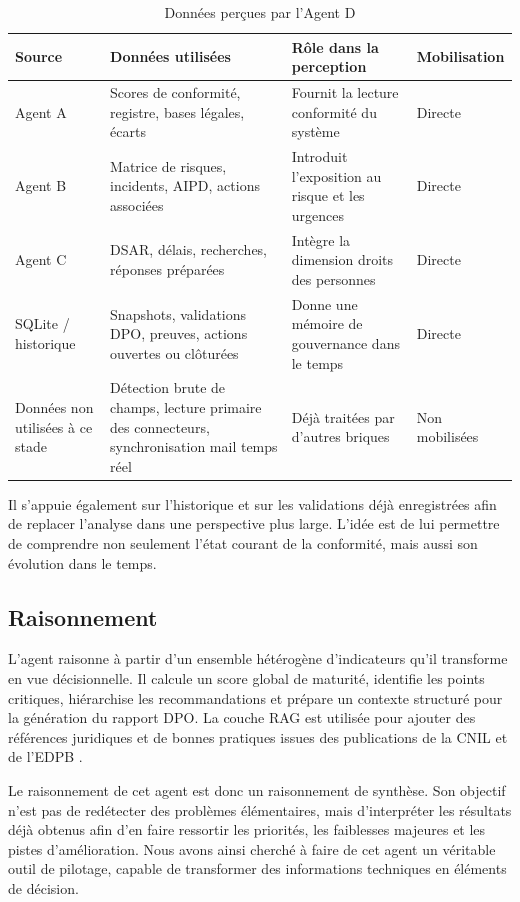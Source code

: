 \documentclass[12pt,a4paper]{report}
\begin{document}
\begin{table}[H]
\centering
\caption{Données perçues par l'Agent D}
\label{tab:perception_agent_d}
\begin{tabularx}{\textwidth}{|p{3cm}|X|X|p{2.7cm}|}
\hline
\textbf{Source} & \textbf{Données utilisées} & \textbf{Rôle dans la perception} & \textbf{Mobilisation} \\
\hline
Agent A & Scores de conformité, registre, bases légales, écarts & Fournit la lecture conformité du système & Directe \\
\hline
Agent B & Matrice de risques, incidents, AIPD, actions associées & Introduit l'exposition au risque et les urgences & Directe \\
\hline
Agent C & DSAR, délais, recherches, réponses préparées & Intègre la dimension droits des personnes & Directe \\
\hline
SQLite / historique & Snapshots, validations DPO, preuves, actions ouvertes ou clôturées & Donne une mémoire de gouvernance dans le temps & Directe \\
\hline
Données non utilisées à ce stade & Détection brute de champs, lecture primaire des connecteurs, synchronisation mail temps réel & Déjà traitées par d'autres briques & Non mobilisées \\
\hline
\end{tabularx}
\end{table}

Il s'appuie également sur l'historique et sur les validations déjà enregistrées afin de replacer l'analyse dans une perspective plus large. L'idée est de lui permettre de comprendre non seulement l'état courant de la conformité, mais aussi son évolution dans le temps.

\subsection{Raisonnement}

L'agent raisonne à partir d'un ensemble hétérogène d'indicateurs qu'il transforme en vue décisionnelle. Il calcule un score global de maturité, identifie les points critiques, hiérarchise les recommandations et prépare un contexte structuré pour la génération du rapport DPO. La couche RAG est utilisée pour ajouter des références juridiques et de bonnes pratiques issues des publications de la CNIL et de l'EDPB \cite{cnil_site,edpb_site}.

Le raisonnement de cet agent est donc un raisonnement de synthèse. Son objectif n'est pas de redétecter des problèmes élémentaires, mais d'interpréter les résultats déjà obtenus afin d'en faire ressortir les priorités, les faiblesses majeures et les pistes d'amélioration. Nous avons ainsi cherché à faire de cet agent un véritable outil de pilotage, capable de transformer des informations techniques en éléments de décision.
\end{document}

